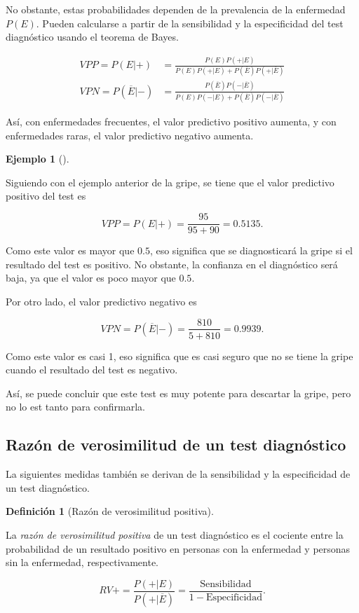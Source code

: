 \documentclass[
  a4paper,
]{scrreport}
\theoremstyle{plain}
\theoremstyle{definition}
\newtheorem{example}{Ejemplo}[chapter]
\theoremstyle{definition}
\newtheorem{definition}{Definición}[chapter]
\theoremstyle{remark}
\begin{document}
No obstante, estas probabilidades dependen de la prevalencia de la
enfermedad \(P(E)\). Pueden calcularse a partir de la sensibilidad y la
especificidad del test diagnóstico usando el teorema de Bayes.

\begin{align*}
VPP=P(E|+) &= \frac{P(E)P(+|E)}{P(E)P(+|E)+P(\overline{E})P(+|\overline{E})}\\
VPN=P(\overline{E}|-) &= \frac{P(\overline{E})P(-|\overline{E})}{P(E)P(-|E)+P(\overline{E})P(-|\overline{E})}
\end{align*}

Así, con enfermedades frecuentes, el valor predictivo positivo aumenta,
y con enfermedades raras, el valor predictivo negativo aumenta.

\begin{example}[]\protect\hypertarget{exm-valores-predictivos}{}\label{exm-valores-predictivos}

Siguiendo con el ejemplo anterior de la gripe, se tiene que el valor
predictivo positivo del test es

\[VPP = P(E|+) = \frac{95}{95+90} = 0.5135.\]

Como este valor es mayor que \(0.5\), eso significa que se diagnosticará
la gripe si el resultado del test es positivo. No obstante, la confianza
en el diagnóstico será baja, ya que el valor es poco mayor que \(0.5\).

Por otro lado, el valor predictivo negativo es

\[VPN = P(\overline{E}|-) = \frac{810}{5+810} = 0.9939.\]

Como este valor es casi 1, eso significa que es casi seguro que no se
tiene la gripe cuando el resultado del test es negativo.

Así, se puede concluir que este test es muy potente para descartar la
gripe, pero no lo est tanto para confirmarla.

\end{example}

\subsection{Razón de verosimilitud de un test
diagnóstico}\label{razuxf3n-de-verosimilitud-de-un-test-diagnuxf3stico}

La siguientes medidas también se derivan de la sensibilidad y la
especificidad de un test diagnóstico.

\begin{definition}[Razón de verosimilitud
positiva]\protect\hypertarget{def-razon-verosimilitud-positiva}{}\label{def-razon-verosimilitud-positiva}

La \emph{razón de verosimilitud positiva} de un test diagnóstico es el
cociente entre la probabilidad de un resultado positivo en personas con
la enfermedad y personas sin la enfermedad, respectivamente.

\[RV+=\frac{P(+|E)}{P(+|\overline{E})} = \frac{\mbox{Sensibilidad}}{1-\mbox{Especificidad}}.\]

\end{definition}
\end{document}
